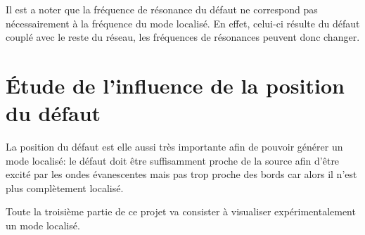 Il est a noter que la fréquence de résonance du défaut ne correspond pas nécessairement à la fréquence du mode localisé. En effet, celui-ci résulte du défaut couplé avec le reste du réseau, les fréquences de résonances peuvent donc changer.


\section{Étude de l'influence de la position du défaut}
La position du défaut est elle aussi très importante afin de pouvoir générer un mode localisé: le défaut doit être suffisamment proche de la source afin d'être excité par les ondes évanescentes mais pas trop proche des bords car alors il n'est plus complètement localisé.



Toute la troisième partie de ce projet va consister à visualiser expérimentalement un mode localisé.
